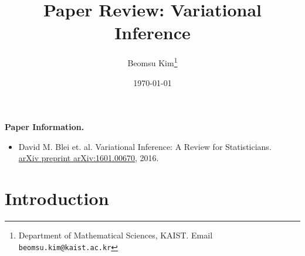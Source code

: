 \documentclass[10pt]{article}
\title{Paper Review: Variational Inference}
\author{Beomsu Kim\footnote{Department of Mathematical Sciences, KAIST. Email \texttt{beomsu.kim@kaist.ac.kr}}}
\date{\today}
\begin{document}
\maketitle

\textbf{Paper Information.}

\begin{itemize}
\item David M. Blei et. al. Variational Inference: A Review for Statisticians. \\ \underline{arXiv preprint arXiv:1601.00670}, 2016.
\end{itemize}

\section{Introduction}
\end{document}
